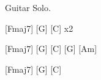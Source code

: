 \begin{guitar}
\begin{multicols}{2}
		\vspace{0.1cm}

		Guitar Solo.
		
		[Fmaj7] \hspace{0.5cm}[G] \hspace{0.5cm} [C] \hspace{0.3cm} x2		
		
		[Fmaj7] \hspace{0.5cm}[G] \hspace{0.5cm} [C] \hspace{0.5cm}[G] \hspace{0.5cm} [Am]
		
		[Fmaj7] \hspace{0.5cm}[G] \hspace{0.5cm} [C]
	\end{multicols}
\end{guitar}
